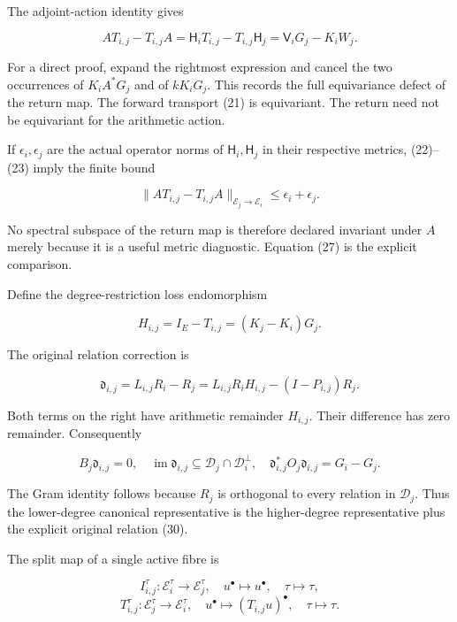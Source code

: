 \documentclass[
  11pt,
]{article}
\begin{document}
The adjoint-action identity gives

\[
 \boxed{AT_{i,j}-T_{i,j}A
 =\mathsf H_iT_{i,j}-T_{i,j}\mathsf H_j
 =\mathsf V_iG_j-K_iW_j.}                                       \tag{27}
\]

For a direct proof, expand the rightmost expression and cancel the two
occurrences of \(K_iA^*G_j\) and of \(kK_iG_j\). This records the full
equivariance defect of the return map. The forward transport (21) is
equivariant. The return need not be equivariant for the arithmetic
action.

If \(\epsilon_i,\epsilon_j\) are the actual operator norms of
\(\mathsf H_i,\mathsf H_j\) in their respective metrics, (22)--(23)
imply the finite bound

\[
 \|AT_{i,j}-T_{i,j}A\|_{\mathscr E_j\to\mathscr E_i}
 \le\epsilon_i+\epsilon_j.                                      \tag{28}
\]

No spectral subspace of the return map is therefore declared invariant
under \(A\) merely because it is a useful metric diagnostic. Equation
(27) is the explicit comparison.

Define the degree-restriction loss endomorphism

\[
 H_{i,j}=I_E-T_{i,j}=(K_j-K_i)G_j.                                \tag{29}
\]

The original relation correction is

\[
 \boxed{\mathfrak d_{i,j}=L_{i,j}R_i-R_j
 =L_{i,j}R_iH_{i,j}-(I-P_{i,j})R_j.}                              \tag{30}
\]

Both terms on the right have arithmetic remainder \(H_{i,j}\). Their
difference has zero remainder. Consequently

\[
 B_j\mathfrak d_{i,j}=0,\quad
 \operatorname{im}\mathfrak d_{i,j}\subseteq
 \mathcal D_j\cap\mathcal D_i^\perp,\quad
 \mathfrak d_{i,j}^*O_j\mathfrak d_{i,j}=G_i-G_j.                  \tag{31}
\]

The Gram identity follows because \(R_j\) is orthogonal to every
relation in \(\mathcal D_j\). Thus the lower-degree canonical
representative is the higher-degree representative plus the explicit
original relation (30).

The split map of a single active fibre is

\[
 I_{i,j}^{\tau}:\mathscr E_i^\tau\to\mathscr E_j^\tau,
 \quad u^\bullet\mapsto u^\bullet,\quad\tau\mapsto\tau,
\] \[
 T_{i,j}^{\tau}:\mathscr E_j^\tau\to\mathscr E_i^\tau,
 \quad u^\bullet\mapsto(T_{i,j}u)^\bullet,\quad\tau\mapsto\tau.    \tag{32}
\]
\end{document}
